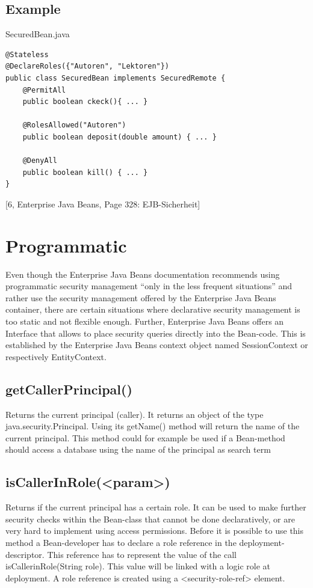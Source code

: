 \documentclass[12pt,a4paper]{report}
\begin{document}
\subsection{Example}

\begin{bclogo}[couleur=yellow!15,arrondi=0.1,logo=\bccrayon, ombre = true]{SecuredBean.java}
\begin{lstlisting}[style=Java]
@Stateless
@DeclareRoles({"Autoren", "Lektoren"})
public class SecuredBean implements SecuredRemote {
	@PermitAll
	public boolean ckeck(){ ... }
	
	@RolesAllowed("Autoren")
	public boolean deposit(double amount) { ... }
	
	@DenyAll
	public boolean kill() { ... }
}
\end{lstlisting}
\end{bclogo}
[6, Enterprise Java Beans, Page 328: EJB-Sicherheit]

\section{Programmatic}
Even though the Enterprise Java Beans documentation recommends using programmatic security management “only in the less frequent situations” and rather use the security management offered by the Enterprise Java Beans container, there are certain situations where declarative security management is too static and not flexible enough. Further, Enterprise Java Beans offers an Interface that allows to place security queries directly into the Bean-code.
This is established by the Enterprise Java Beans context object named SessionContext or respectively EntityContext.

\subsection{getCallerPrincipal()}
Returns the current principal (caller). It returns an object of the type java.security.Principal. Using its getName() method will return the name of the current principal.
This method could for example be used if a Bean-method should access a database using the name of the principal as search term

\subsection{isCallerInRole(<param>)}
Returns if the current principal has a certain role. It can be used to make further security checks within the Bean-class that cannot be done declaratively, or are very hard to implement using access permissions.
Before it is possible to use this method a Bean-developer has to declare a role reference in the deployment-descriptor. This reference has to represent the value of the call isCallerinRole(String role). This value will be linked with a logic role at deployment. A role reference is created using a <security-role-ref> element.
\end{document}
